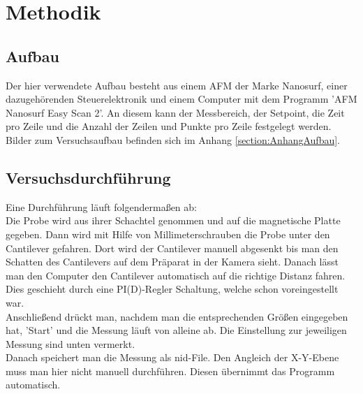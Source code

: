 

\def\skalierung{0.65}

\chapter{Methodik}
\label{chap:protokoll}
\section{Aufbau}

Der hier verwendete Aufbau besteht aus einem AFM der Marke Nanosurf, einer dazugehörenden Steuerelektronik und einem Computer mit dem 
Programm  'AFM  Nanosurf  Easy  Scan  2'. An diesem kann der Messbereich, der Setpoint, die Zeit pro Zeile und die Anzahl der Zeilen und 
Punkte pro Zeile festgelegt werden. Bilder zum Versuchsaufbau befinden sich im Anhang \ref{section:AnhangAufbau}. \\

\section{Versuchsdurchführung}

Eine Durchführung läuft folgendermaßen ab:\\
Die Probe wird aus ihrer Schachtel genommen und auf die magnetische Platte gegeben. Dann wird mit Hilfe von Millimeterschrauben die Probe unter den Cantilever gefahren. 
Dort wird der Cantilever manuell abgesenkt bis man den Schatten des Cantilevers auf dem Präparat in der Kamera sieht. Danach lässt man den Computer den Cantilever 
automatisch auf die richtige Distanz fahren. Dies geschieht durch eine PI(D)-Regler Schaltung, welche schon voreingestellt war. \\
Anschließend drückt man, nachdem man die entsprechenden Größen eingegeben hat, 'Start' und die Messung läuft von alleine ab. Die Einstellung zur jeweiligen Messung sind unten 
vermerkt.\\
Danach speichert man die Messung als nid-File. Den Angleich der X-Y-Ebene muss man hier nicht manuell durchführen. Diesen übernimmt das Programm automatisch.


